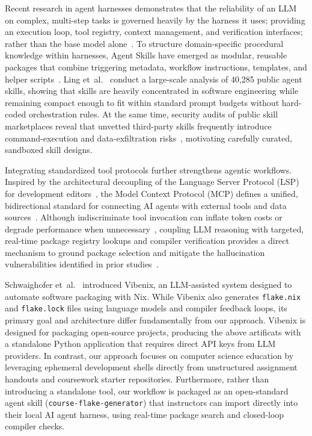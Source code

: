 Recent research in agent harnesses demonstrates that the reliability of an LLM
on complex, multi-step tasks is governed heavily by the harness it uses;
providing an execution loop, tool registry, context management, and verification interfaces;
rather than the base model alone~\cite{mengAgentHarnessLarge2026,formentScaffoldingMattersMore2026}.
To structure domain-specific procedural knowledge within harnesses, Agent Skills
have emerged as modular, reusable packages that combine triggering metadata,
workflow instructions, templates, and helper scripts~\cite{AgentSkills,lingAgentSkillsDataDriven2026}.
Ling et~al.~\cite{lingAgentSkillsDataDriven2026} conduct a large-scale analysis
of 40,285 public agent skills, showing that skills are heavily concentrated in software
engineering while remaining compact enough to fit within standard prompt budgets without
hard-coded orchestration rules. At the same time, security audits of public skill
marketplaces reveal that unvetted third-party skills frequently introduce command-execution
and data-exfiltration risks~\cite{beurer-kellnerTechnicalReportExploring2026,lingAgentSkillsDataDriven2026},
motivating carefully curated, sandboxed skill designs.

Integrating standardized tool protocols further strengthens agentic workflows.
Inspired by the architectural decoupling of the Language Server Protocol (LSP)
for development editors~\cite{borkLanguageServerProtocol2023}, the Model Context Protocol
(MCP) defines a unified, bidirectional standard for connecting AI agents with
external tools and data sources~\cite{MCPLandscape}. Although indiscriminate tool
invocation can inflate token costs or degrade performance when unnecessary~\cite{wuCallNotCall2026,formentScaffoldingMattersMore2026},
coupling LLM reasoning with targeted, real-time package registry lookups and compiler
verification provides a direct mechanism to ground package selection and mitigate
the hallucination vulnerabilities identified in prior studies~\cite{ImportingPhantomsMeasuring,zhangDeployabilityCentricInfrastructureasCodeGeneration2025}.

Schwaighofer et~al.~\cite{schwaighoferVibenixAIAssistant2026} introduced Vibenix,
an LLM-assisted system designed to automate software packaging with Nix. While
Vibenix also generates \texttt{flake.nix} and \texttt{flake.lock} files using
language models and compiler feedback loops, its primary goal and architecture differ
fundamentally from our approach. Vibenix is designed for packaging open-source
projects, producing the above artificats with a standalone Python application that
requires direct API keys from LLM providers. In contrast, our approach focuses on
computer science education by leveraging ephemeral development shells directly from
unstructured assignment handouts and coursework starter repositories.
Furthermore, rather than introducing a standalone tool, our workflow is packaged
as an open-standard agent skill (\texttt{course-flake-generator}) that instructors
can import directly into their local AI agent harness, using real-time package
search and closed-loop compiler checks.

